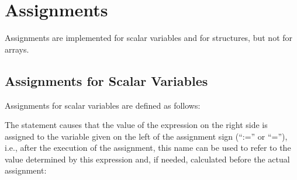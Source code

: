 
\section{Assignments}   %
\label{sec_assignments}

Assignments are implemented for scalar variables and for structures, but
not for arrays.

\begin{grammarframe}
\end{grammarframe}

\subsection{Assignments for Scalar Variables}   %

Assignments for scalar variables are defined as follows:

\begin{grammarframe}
\end{grammarframe}

The statement causes that the value of the expression on the right side
is assigned to the variable given on the left of the assignment sign
(``:='' or ``=''), i.e., after the execution of the assignment, this
name can be used to refer to the value determined by this expression
and, if needed, calculated before the actual assignment:

